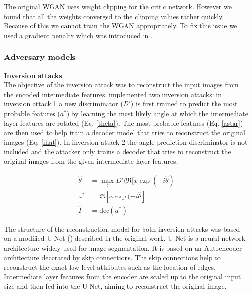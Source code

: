 The original WGAN uses weight clipping for the critic network. However we found that all the weights converged to the clipping values rather quickly. Because of this we cannot train the WGAN appropriately. To fix this issue we used a gradient penalty which was introduced in \cite{DBLP:journals/corr/GulrajaniAADC17}.

\subsubsection{Adversary models}

\textbf{Inversion attacks}\\
The objective of the inversion attack was to reconstruct the input images from the encoded intermediate features. \cite{xiang2020interpretable} implemented two inversion attacks: in inversion attack 1 a new discriminator ($D'$) is first trained to predict the most probable features ($a^*$) by learning the most likely angle at which the intermediate layer features are rotated (Eq. \ref{theta}). The most probable features (Eq. \ref{astar}) are then used to help train a decoder model that tries to reconstruct the original images (Eq. \ref{ihat}). In inversion attack 2 the angle prediction discriminator is not included and the attacker only trains a decoder that tries to reconstruct the original images from the given intermediate layer features. 

\begin{align}
    \hat{\theta} &= \max_{\theta}D'(\Re[x\exp(-i\hat{\theta}) \label{theta} \\
    a^* &= \Re[x\exp(-i\hat{\theta}] \label{astar} \\
    \hat{I} &= \text{dec}(a^*) \label{ihat}
\end{align}

The structure of the reconstruction model for both inversion attacks was based on a modified U-Net (\cite{U-net}) described in the original work. U-Net is a neural network architecture widely used for image segmentation. It is based on an Autoencoder architecture decorated by skip connections. The skip connections help to reconstruct the exact low-level attributes such as the location of edges. Intermediate layer features from the encoder are scaled up to the original input size and then fed into the U-Net, aiming to reconstruct the original image. 

